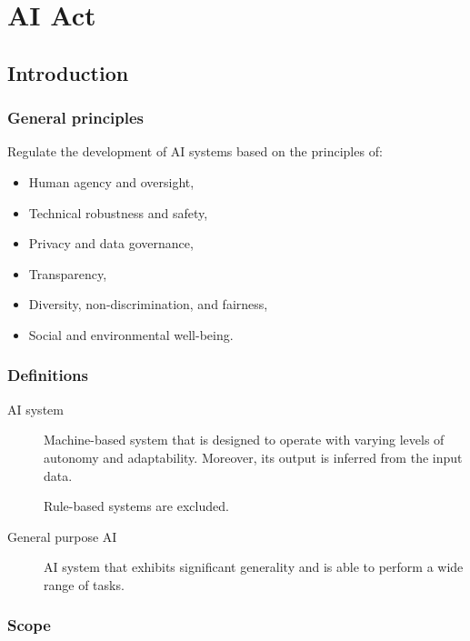 \chapter{AI Act}


\section{Introduction}


\subsection{General principles}

Regulate the development of AI systems based on the principles of:
\begin{itemize}
    \item Human agency and oversight,
    \item Technical robustness and safety,
    \item Privacy and data governance,
    \item Transparency,
    \item Diversity, non-discrimination, and fairness,
    \item Social and environmental well-being.
\end{itemize}


\subsection{Definitions}

\begin{description}
    \item[AI system] 
        Machine-based system that is designed to operate with varying levels of autonomy and adaptability. Moreover, its output is inferred from the input data.

        \begin{remark}
            Rule-based systems are excluded.
        \end{remark}

    \item[General purpose AI] 
        AI system that exhibits significant generality and is able to perform a wide range of tasks.
\end{description}


\subsection{Scope}


